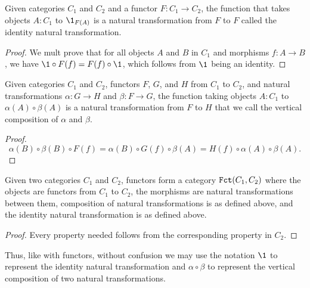 \documentclass[../math.tex]{subfiles}
\begin{document}
\begin{theorem}
    Given categories $C_1$ and $C_2$ and a functor $F : C_1 \to C_2$, the
    function that takes objects $A : C_1$ to $\1_{F(A)}$ is a natural
    transformation from $F$ to $F$ called the identity natural transformation.
\end{theorem}
\begin{proof}
    We mult prove that for all objects $A$ and $B$ in $C_1$ and morphisms $f : A
    \to B$, we have $\1 \circ F(f) = F(f) \circ \1$, which follows from $\1$
    being an identity.
\end{proof}

\begin{theorem}
    Given categories $C_1$ and $C_2$, functors $F$, $G$, and $H$ from $C_1$
    to $C_2$, and natural transformations $\alpha : G \to H$ and $\beta : F \to
    G$, the function taking objects $A : C_1$ to $\alpha(A) \circ \beta(A)$ is a
    natural transformation from $F$ to $H$ that we call the vertical composition
    of $\alpha$ and $\beta$.
\end{theorem}
\begin{proof}
    \[
        \alpha(B) \circ \beta(B) \circ F(f) =
        \alpha(B) \circ G(f) \circ \beta(A) =
        H(f) \circ \alpha(A) \circ \beta(A).
    \]
\end{proof}

\begin{theorem}
    Given two categories $C_1$ and $C_2$, functors form a category $\Fct(C_1,
    C_2)$ where the objects are functors from $C_1$ to $C_2$, the morphisms are
    natural transformations between them, composition of natural transformations
    is as defined above, and the identity natural transformation is as defined
    above.
\end{theorem}
\begin{proof}
    Every property needed follows from the corresponding property in $C_2$.
\end{proof}

Thus, like with functors, without confusion we may use the notation $\1$
to represent the identity natural transformation and $\alpha \circ \beta$ to
represent the vertical composition of two natural transformations.
\end{document}
